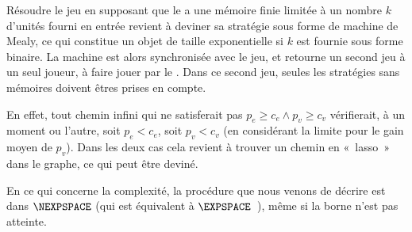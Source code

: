 Résoudre le jeu en supposant que le \jo a une mémoire finie limitée à un nombre $k$ d'unités fourni en entrée revient à deviner sa stratégie sous forme de machine de Mealy, ce qui constitue un objet de taille exponentielle si $k$ est fournie sous forme binaire.
La machine est alors synchronisée avec le jeu, et retourne un second jeu à un seul joueur, à faire jouer par le \ji.
Dans ce second jeu, seules les stratégies sans mémoires doivent êtres prises en compte.

En effet, tout chemin infini qui ne satisferait pas $p_e \geq c_e \wedge p_v \geq c_v$ vérifierait, à un moment ou l'autre, soit $p_e < c_e$, soit $p_v < c_v$ (en considérant la limite pour le gain moyen de $p_v$).
Dans les deux cas cela revient à trouver un chemin en « lasso » dans le graphe, ce qui peut être deviné.

En ce qui concerne la complexité, la procédure que nous venons de décrire est dans $\NEXPSPACE$ (qui est équivalent à $\EXPSPACE$~\cite[Chap.~20]{papadimitriou94}), même si la borne n'est pas atteinte.
